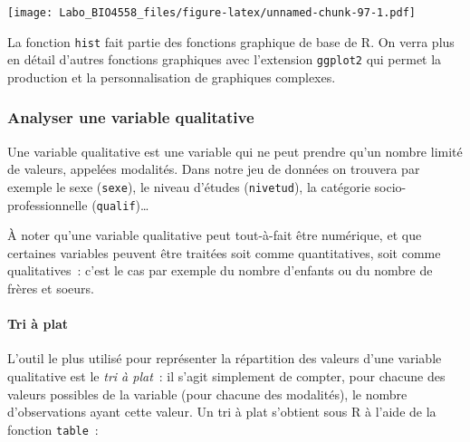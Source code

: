 \documentclass[12pt,]{book}
\newenvironment{Shaded}{\begin{snugshade}}{\end{snugshade}}
\newcommand{\DataTypeTok}[1]{\textcolor[rgb]{0.27,0.27,0.27}{#1}}
\newcommand{\KeywordTok}[1]{\textcolor[rgb]{0.27,0.27,0.27}{\textbf{#1}}}
\newcommand{\NormalTok}[1]{#1}
\newcommand{\OperatorTok}[1]{\textcolor[rgb]{0.43,0.43,0.43}{\textbf{#1}}}
\newcommand{\StringTok}[1]{\textcolor[rgb]{0.5,0.5,0.5}{#1}}
\let\oldparagraph\paragraph
\renewcommand{\paragraph}[1]{\oldparagraph{#1}\mbox{}}
\begin{document}
\begin{Shaded}
\end{Shaded}

\texttt{[image: Labo\_BIO4558\_files/figure-latex/unnamed-chunk-97-1.pdf]}

La fonction \texttt{hist} fait partie des fonctions graphique de base de R. On verra plus en détail d'autres fonctions graphiques
avec l'extension \texttt{ggplot2} qui permet la production et la personnalisation de graphiques complexes.

\hypertarget{analyser-une-variable-qualitative}{%
\subsubsection{Analyser une variable qualitative}\label{analyser-une-variable-qualitative}}

Une variable qualitative est une variable qui ne peut prendre qu'un nombre limité de valeurs, appelées modalités. Dans notre jeu de données on trouvera par exemple le sexe (\texttt{sexe}), le niveau d'études (\texttt{nivetud}), la catégorie socio-professionnelle (\texttt{qualif})\ldots{}

À noter qu'une variable qualitative peut tout-à-fait être numérique, et que certaines variables peuvent être traitées soit comme quantitatives, soit comme qualitatives~: c'est le cas par exemple du nombre d'enfants ou du nombre de frères et soeurs.

\hypertarget{tri-uxe0-plat}{%
\paragraph{Tri à plat}\label{tri-uxe0-plat}}

L'outil le plus utilisé pour représenter la répartition des valeurs d'une variable qualitative est le \emph{tri à plat}~: il s'agit simplement de compter, pour chacune des valeurs possibles de la variable (pour chacune des modalités), le nombre d'observations ayant cette valeur. Un tri à plat s'obtient sous R à l'aide de la fonction \texttt{table}~:
\end{document}
